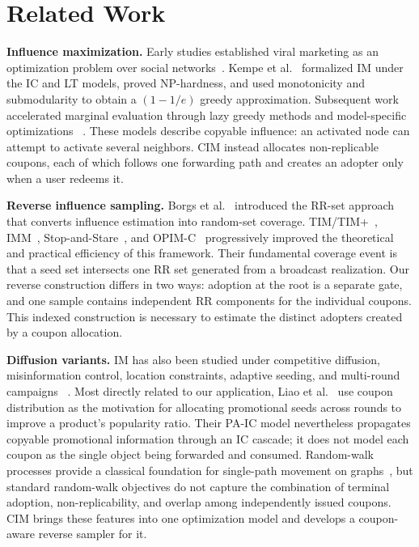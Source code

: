 \documentclass[sigconf,balance=false]{acmart}
\begin{document}
\section{Related Work}
\label{sec:related}

\textbf{Influence maximization.}
Early studies established viral marketing as an optimization problem
over social networks~\cite{domingos2001mining,richardson2002mining}.
Kempe et al.~\cite{kempe2003maximizing} formalized IM under the IC and
LT models, proved NP-hardness, and used monotonicity and submodularity to
obtain a $(1-1/e)$ greedy approximation.
Subsequent work accelerated marginal evaluation through lazy greedy
methods and model-specific optimizations
~\cite{leskovec2007celf,goyal2011celf,chen2009efficient}.
These models describe copyable influence: an activated node can attempt
to activate several neighbors.
CIM instead allocates non-replicable coupons, each of which follows one
forwarding path and creates an adopter only when a user redeems it.

\textbf{Reverse influence sampling.}
Borgs et al.~\cite{borgs2014maximizing} introduced the RR-set approach
that converts influence estimation into random-set coverage.
TIM/TIM+~\cite{tang2014influence}, IMM~\cite{tang2015influence},
Stop-and-Stare~\cite{nguyen2016stop,huang2017revisiting}, and
OPIM-C~\cite{tang2018online} progressively improved the theoretical and
practical efficiency of this framework.
Their fundamental coverage event is that a seed set intersects one RR
set generated from a broadcast realization.
Our reverse construction differs in two ways: adoption at the root is a
separate gate, and one sample contains independent RR components for the
individual coupons.
This indexed construction is necessary to estimate the distinct adopters
created by a coupon allocation.

\textbf{Diffusion variants.}
IM has also been studied under competitive diffusion, misinformation
control, location constraints, adaptive seeding, and multi-round
campaigns
~\cite{budak2011limiting,li2014efficient,lu2015competition,seeman2013adaptive,sun2018multi}.
Most directly related to our application, Liao et
al.~\cite{liao2023popularity} use coupon distribution as the motivation
for allocating promotional seeds across rounds to improve a product's
popularity ratio.
Their PA-IC model nevertheless propagates copyable promotional
information through an IC cascade; it does not model each coupon as the
single object being forwarded and consumed.
Random-walk processes provide a classical foundation for single-path
movement on graphs~\cite{lovasz1993random}, but standard random-walk
objectives do not capture the combination of terminal adoption,
non-replicability, and overlap among independently issued coupons.
CIM brings these features into one optimization model and develops a
coupon-aware reverse sampler for it.
\end{document}
